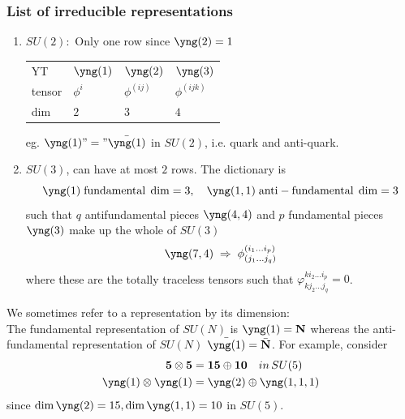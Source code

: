 \subsubsection{List of irreducible representations}
\begin{enumerate}
	\item $SU(2):$ Only one row since $\yng(2)=1$\\
	\begin{tabular}{llll}
		YT  &$\yng(1)$&$\yng(2)$ &$\yng(3)$\\
		tensor & $\phi^i$&$\phi^{(ij)}$ &  $\phi^{(ijk)}$ \\
dim & $2$&$3$ & $4$ \\
	\end{tabular}
eg. $\yng(1) "=" \bar{\yng(1)}$ in $SU(2)$, i.e. quark and anti-quark.
\item $SU(3)$, can have at most $2$ rows. The dictionary is 
\begin{equation}
	\yng(1) \; \mathrm{fundamental}\; \dim=3,\quad \yng(1,1) \; \mathrm{anti-fundamental}\; \dim=3
\end{equation}
such that $q$ antifundamental pieces $\yng(4,4)$ and $p$ fundamental pieces $\yng(3)$ make up the whole of $SU(3)$
\begin{equation}
	\yng(7,4) \; \Rightarrow \; \phi^{(i_1\dots i_p)}_{(j_1 \dots j_q)} 
\end{equation}
where these are the totally traceless tensors such that $\varphi^{k i_2 \dots i_p}_{k j_2 \dots j_q}=0$.
\end{enumerate}
We sometimes refer to a representation by its dimension:\\
The fundamental representation of $SU(N)$ is $\yng(1)= \mathbf{N}$ whereas the anti-fundamental representation of $SU(N)$ $\bar{\yng(1)} = \bar{\mathbf{N}}$.
For example, consider
\begin{align*}
	\mathbf{5}\otimes \mathbf{5} &= \mathbf{15} \oplus \mathbf{10} \quad in\, SU(5) \\
	\yng(1) \otimes \yng(1) &= \yng(2) \oplus \yng(1,1,1) 
\end{align*}
since
$\dim\yng(2) =15, \dim \yng(1,1)=10$ in $SU(5)$.


